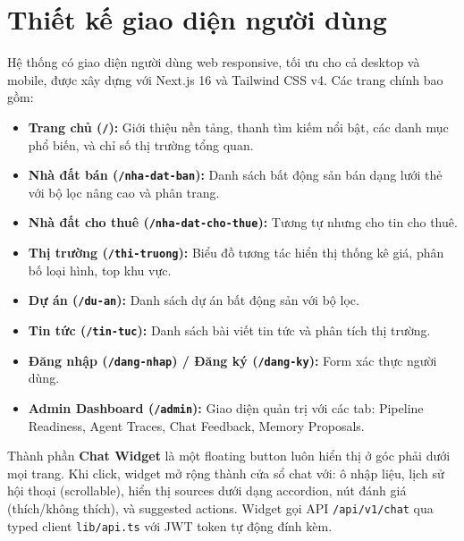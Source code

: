 \section{Thiết kế giao diện người dùng}

Hệ thống có giao diện người dùng web responsive, tối ưu cho cả desktop và mobile, được xây dựng với Next.js 16 và Tailwind CSS v4. Các trang chính bao gồm:

\begin{itemize}
    \item \textbf{Trang chủ (\texttt{/}):} Giới thiệu nền tảng, thanh tìm kiếm nổi bật, các danh mục phổ biến, và chỉ số thị trường tổng quan.
    \item \textbf{Nhà đất bán (\texttt{/nha-dat-ban}):} Danh sách bất động sản bán dạng lưới thẻ với bộ lọc nâng cao và phân trang.
    \item \textbf{Nhà đất cho thuê (\texttt{/nha-dat-cho-thue}):} Tương tự nhưng cho tin cho thuê.
    \item \textbf{Thị trường (\texttt{/thi-truong}):} Biểu đồ tương tác hiển thị thống kê giá, phân bố loại hình, top khu vực.
    \item \textbf{Dự án (\texttt{/du-an}):} Danh sách dự án bất động sản với bộ lọc.
    \item \textbf{Tin tức (\texttt{/tin-tuc}):} Danh sách bài viết tin tức và phân tích thị trường.
    \item \textbf{Đăng nhập (\texttt{/dang-nhap}) / Đăng ký (\texttt{/dang-ky}):} Form xác thực người dùng.
    \item \textbf{Admin Dashboard (\texttt{/admin}):} Giao diện quản trị với các tab: Pipeline Readiness, Agent Traces, Chat Feedback, Memory Proposals.
\end{itemize}

Thành phần \textbf{Chat Widget} là một floating button luôn hiển thị ở góc phải dưới mọi trang. Khi click, widget mở rộng thành cửa sổ chat với: ô nhập liệu, lịch sử hội thoại (scrollable), hiển thị sources dưới dạng accordion, nút đánh giá (thích/không thích), và suggested actions. Widget gọi API \texttt{/api/v1/chat} qua typed client \texttt{lib/api.ts} với JWT token tự động đính kèm.

\newpage
